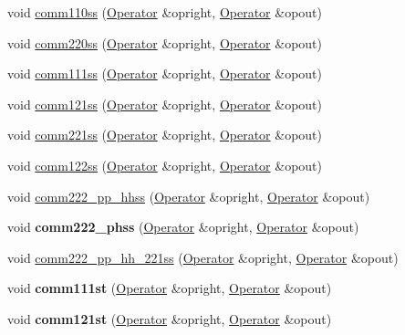 \begin{DoxyCompactItemize}
\item 
void \hyperlink{classOperator_a23bf6f89477ba90fd6f798374d00d9ea}{comm110ss} (\hyperlink{classOperator}{Operator} \&opright, \hyperlink{classOperator}{Operator} \&opout)
\item 
void \hyperlink{classOperator_ac924a2af30154c83d6b821707689caa5}{comm220ss} (\hyperlink{classOperator}{Operator} \&opright, \hyperlink{classOperator}{Operator} \&opout)
\item 
void \hyperlink{classOperator_a1cfdcf9d390bd8bbfdd4473c6a78071e}{comm111ss} (\hyperlink{classOperator}{Operator} \&opright, \hyperlink{classOperator}{Operator} \&opout)
\item 
void \hyperlink{classOperator_abb92eaedbea81e56c60939588371042f}{comm121ss} (\hyperlink{classOperator}{Operator} \&opright, \hyperlink{classOperator}{Operator} \&opout)
\item 
void \hyperlink{classOperator_a423dc256b5780dbee20ac81c9a655335}{comm221ss} (\hyperlink{classOperator}{Operator} \&opright, \hyperlink{classOperator}{Operator} \&opout)
\item 
void \hyperlink{classOperator_a2214e0f4647940855ff1866c2407c078}{comm122ss} (\hyperlink{classOperator}{Operator} \&opright, \hyperlink{classOperator}{Operator} \&opout)
\item 
void \hyperlink{classOperator_ad70b2fe8c17a836aa8ea8c28ad445fd0}{comm222\-\_\-pp\-\_\-hhss} (\hyperlink{classOperator}{Operator} \&opright, \hyperlink{classOperator}{Operator} \&opout)
\item 
\hypertarget{classOperator_a030805d35049c5cd62eaa84fe42e59e9}{void {\bfseries comm222\-\_\-phss} (\hyperlink{classOperator}{Operator} \&opright, \hyperlink{classOperator}{Operator} \&opout)}\label{classOperator_a030805d35049c5cd62eaa84fe42e59e9}

\item 
void \hyperlink{classOperator_acb2df128030bcad71f2b3fd975ea7988}{comm222\-\_\-pp\-\_\-hh\-\_\-221ss} (\hyperlink{classOperator}{Operator} \&opright, \hyperlink{classOperator}{Operator} \&opout)
\item 
\hypertarget{classOperator_ad32f3dab6883f4a0bbf3abd416c9c756}{void {\bfseries comm111st} (\hyperlink{classOperator}{Operator} \&opright, \hyperlink{classOperator}{Operator} \&opout)}\label{classOperator_ad32f3dab6883f4a0bbf3abd416c9c756}

\item 
\hypertarget{classOperator_ad6cf6f66211d0893ef0784cde14445f0}{void {\bfseries comm121st} (\hyperlink{classOperator}{Operator} \&opright, \hyperlink{classOperator}{Operator} \&opout)}\label{classOperator_ad6cf6f66211d0893ef0784cde14445f0}


\end{DoxyCompactItemize}
